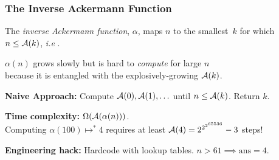 			




\begin{frame}
\frametitle{The Inverse Ackermann Function}

The \emph{inverse Ackermann function}, $\alpha$, maps $n$ to the smallest~$k$ for
which~$n \le \mathcal{A}(k)$, \emph{i.e} .

\smallskip

\pause 
$\alpha(n)$ grows slowly but is hard to \emph{compute} for large $n$
\\ because it is entangled with the explosively-growing $\mathcal{A}(k)$.

\bigskip


\pause 
\textbf{Naive Approach:} Compute $\mathcal{A}(0), \mathcal{A}(1), \ldots$ until $n\le \mathcal{A}(k)$. Return $k$.

\bigskip

\pause 
\textbf{Time complexity:} $\Omega(\mathcal{A}(\alpha(n)))$.
\\ Computing $\alpha(100) \mapsto^{*} 4$ requires at least
$\mathcal{A}(4) = 2^{2^{2^{65536}}} - 3$ steps!

\bigskip

\pause 
\textbf{Engineering hack:} Hardcode with lookup tables. $n > 61 \implies \text{ans} = 4$.

\bigskip

\pause 
{}
\end{frame}

%
%
%
%
%
%


